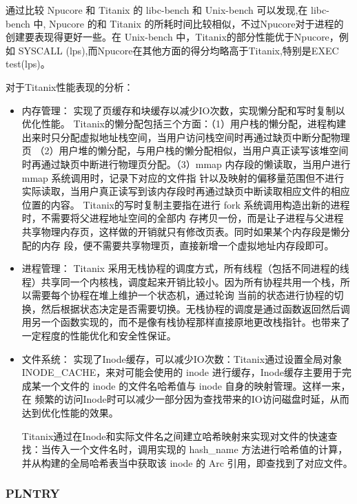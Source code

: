 通过比较 Npucore 和 Titanix 的 libc-bench 和 Unix-bench 可以发现,在 libc-bench 中,
Npucore 的和 Titanix 的所耗时间比较相似，不过Npucore对于进程的创建要表现得更好一些。在 Unix-bench 中，Titanix的部分性能优于Npucore，例如
SYSCALL (lps),而Npucore在其他方面的得分均略高于Titanix,特别是EXEC test(lps)。

对于Titanix性能表现的分析：
\begin{itemize}
    \item 内存管理：
    实现了页缓存和块缓存以减少IO次数，实现懒分配和写时复制以优化性能。
    Titanix的懒分配包括三个方面：（1）用户栈的懒分配，进程构建出来时只分配虚拟地址栈空间，当用户访问栈空间时再通过缺页中断分配物理页
    （2）用户堆的懒分配，与用户栈的懒分配相似，当用户真正读写该堆空间时再通过缺页中断进行物理页分配。（3）mmap 内存段的懒读取，当用户进行 mmap 系统调用时，记录下对应的文件指
    针以及映射的偏移量范围但不进行实际读取，当用户真正读写到该内存段时再通过缺页中断读取相应文件的相应位置的内容。
    Titanix的写时复制主要指在进行 fork 系统调用构造出新的进程时，不需要将父进程地址空间的全部内
    存拷贝一份，而是让子进程与父进程共享物理内存页，这样做的开销就只有修改页表。同时如果某个内存段是懒分配的内存
    段，便不需要共享物理页，直接新增一个虚拟地址内存段即可。
    \item 进程管理：
    Titanix 采用无栈协程的调度方式，所有线程（包括不同进程的线程）共享同一个内核栈，调度起来开销比较小。因为所有协程共用一个栈，所以需要每个协程在堆上维护一个状态机，通过轮询
    当前的状态进行协程的切换，然后根据状态决定是否需要切换。无栈协程的调度是通过函数返回然后调用另一个函数实现的，而不是像有栈协程那样直接原地更改栈指针。也带来了一定程度的性能优化和安全性保证。
    \item 文件系统：
    实现了Inode缓存，可以减少IO次数：Titanix通过设置全局对象 INODE_CACHE，来对可能会使用的 inode 进行缓存，Inode缓存主要用于完成某一个文件的 inode 的文件名哈希值与 inode 自身的映射管理。这样一来，在
    频繁的访问Inode时可以减少一部分因为查找带来的IO访问磁盘时延，从而达到优化性能的效果。
    
    Titanix通过在Inode和实际文件名之间建立哈希映射来实现对文件的快速查找：当传入一个文件名时，调用实现的 hash_name 方法进行哈希值的计算，并从构建的全局哈希表当中获取该 inode 的
    Arc 引用，即查找到了对应文件。


\end{itemize}

\subsubsection{PLNTRY}

